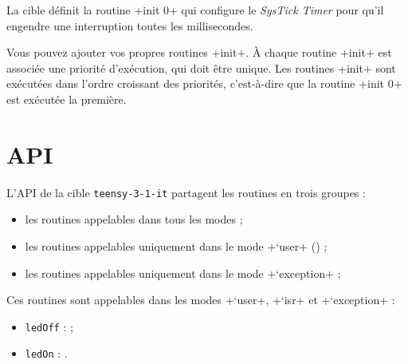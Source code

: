 
La cible définit la routine \plm+init 0+ qui configure le \emph{SysTick Timer} pour qu'il engendre une interruption toutes les millisecondes.

Vous pouvez ajouter vos propres routines \plm+init+. À chaque routine \plm+init+ est associée une priorité d'exécution, qui doit être unique. Les routines \plm+init+ sont exécutées dans l'ordre croissant des priorités, c'est-à-dire que la routine \plm+init 0+ est exécutée la première.












\section{API}

L'API de la cible \texttt{teensy-3-1-it} partagent les routines en trois groupes :
\begin{itemize}
  \item les routines appelables dans tous les modes ;
  \item les routines appelables uniquement dans le mode \plm+`user+ () ;
  \item les routines appelables uniquement dans le mode \plm+`exception+ ;
\end{itemize}


Ces routines sont appelables dans les modes \plm+`user+, \plm+`isr+ et \plm+`exception+ :
\begin{itemize}
\item \texttt{ledOff} :  ;
\item \texttt{ledOn} : .
\end{itemize}






